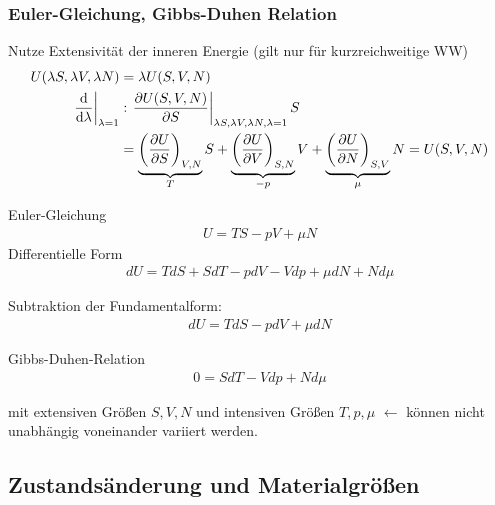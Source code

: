 \subsubsection{Euler-Gleichung, Gibbs-Duhen Relation}
Nutze Extensivität der inneren Energie (gilt nur für kurzreichweitige WW)
\begin{align}
    U(\lambda S,\lambda V, \lambda N)&=\lambda U(S,V,N)\\
    \eval{\dv{\lambda}}_{\lambda=1}&: \eval{\pd{U(S,V,N)}{S}}_{\lambda S,\lambda V,\lambda N, \lambda=1}S\\
    &= \underbrace{\left(\pd{U}{S}\right)_{V,N}}_{T} S+ \underbrace{\left(\pd{U}{V}\right)_{S,N}}_{-p} V + \underbrace{\left(\pd{U}{N}\right)_{S,V}}_{\mu} N = U(S,V,N)
\end{align}

\begin{definition}{Euler-Gleichung}
    \begin{align}
        U=TS-pV+\mu N
    \end{align}
    Differentielle Form
    \begin{align}
        dU=TdS + SdT - pdV - Vdp + \mu dN + Nd\mu
    \end{align}
    
\end{definition}
Subtraktion der Fundamentalform:
    \begin{align}
        dU = TdS -pdV + \mu dN
    \end{align}
\begin{definition}{Gibbs-Duhen-Relation}
    \begin{align}
        0= SdT - Vdp + Nd\mu
    \end{align}
\end{definition}
mit extensiven Größen $S,V,N$ und intensiven Größen $T,p,\mu$ $\leftarrow$ können nicht unabhängig voneinander variiert werden.


\subsection{Zustandsänderung und Materialgrößen}

